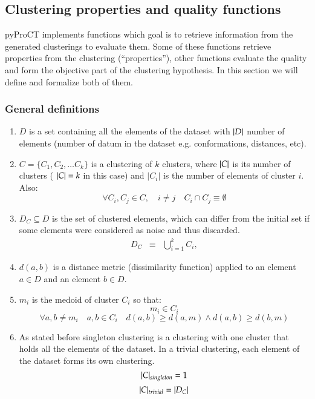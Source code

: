 \subsection{Clustering properties and quality functions}
\label{sec:pyproct_supp_2}

pyProCT implements functions which goal is to retrieve information
from the generated clusterings to evaluate them. Some of these functions
retrieve properties from the clustering (\textquotedblleft properties\textquotedblright ),
other functions evaluate the quality and form the objective part of the
clustering hypothesis. In this section we will define and formalize
both of them.


\subsubsection{General definitions}

\begin{enumerate}
\item $D$ is a set containing all the elements of the dataset with $\lvert D\rvert$
number of elements (number of datum in the dataset e.g. conformations,
distances, etc). 
\item $C=\{C_{1},C_{2},\dotsc C_{k}\}$ is a clustering of $k$ clusters,
where $\lvert C\rvert$ is its number of clusters ( $\lvert C\rvert=k$ in this case)
and $|C_{i}|$ is the number of elements of cluster $i$. Also:
\begin{equation}
\forall C_{i},C_{j}\in C,\quad i\neq j\quad C_{i}\cap C_{j}\equiv\emptyset
\end{equation}

\item $D_{C}\subseteq D$ is the set of clustered elements, which can differ
from the initial set if some elements were considered as noise and
thus discarded.
\begin{eqnarray}
D_{C} & \equiv & \bigcup_{i=1}^{k}C_{i},
\end{eqnarray}

\item $d(a,b)$ is a distance metric (dissimilarity function) applied to
an element $a\in D$ and an element $b\in D$.
\item $m_{i}$ is the medoid of cluster $C_{i}$ so that:
\begin{equation}
m_{i}\in C_{i}
\end{equation}
\begin{equation}
\forall a,b\neq m_{i}\quad a,b\in C_{i}\quad d(a,b)\geq d(a,m)\wedge d(a,b)\geq d(b,m)
\end{equation}

\item As stated before singleton clustering is a clustering with one cluster
that holds all the elements of the dataset. In a trivial clustering,
each element of the dataset forms its own clustering.
\begin{equation}
\lvert C\rvert_{singleton}=1
\end{equation}
\begin{equation}
\lvert C\rvert_{trivial}=\lvert D_{C}\rvert
\end{equation}

\end{enumerate}

